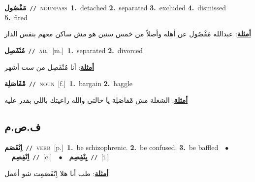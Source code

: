 \documentclass[10pt,a4paper,twoside]{article} %
\begin{document}
\begin{multicols}{2}
{\setlength\topsep{0pt}\textbf{\foreignlanguage{arabic}{مَفْصُول}}\ {\color{gray}\texttt{//}\color{black}}\ \textsc{noun\textunderscore pass}\ \textbf{1.}~detached  \textbf{2.}~separated  \textbf{3.}~excluded  \textbf{4.}~dismissed  \textbf{5.}~fired\  \begin{flushright}\color{gray}\foreignlanguage{arabic}{\textbf{\underline{\foreignlanguage{arabic}{أمثلة}}}: عبدالله مَفْصُول عن أهله وأصلاً من خمس سنين هو مش ساكن معهم بنفس الدار}\end{flushright}\color{black}} \vspace{2mm}

{\setlength\topsep{0pt}\textbf{\foreignlanguage{arabic}{مُنْفَصِل}}\ {\color{gray}\texttt{//}\color{black}}\ \textsc{adj}\ [m.]\ \textbf{1.}~separated  \textbf{2.}~divorced\  \begin{flushright}\color{gray}\foreignlanguage{arabic}{\textbf{\underline{\foreignlanguage{arabic}{أمثلة}}}: أنا مُنْفَصِل من ست أشهر}\end{flushright}\color{black}} \vspace{2mm}

{\setlength\topsep{0pt}\textbf{\foreignlanguage{arabic}{مْفَاصَلِة}}\ {\color{gray}\texttt{//}\color{black}}\ \textsc{noun}\ [f.]\ \textbf{1.}~bargain  \textbf{2.}~haggle\  \begin{flushright}\color{gray}\foreignlanguage{arabic}{\textbf{\underline{\foreignlanguage{arabic}{أمثلة}}}: الشغلة مش مْفاصَلِة يا خالتي والله راعيتك باللي بقدر عليه}\end{flushright}\color{black}} \vspace{2mm}

\vspace{-3mm}
\subsection*{\color{blue}\foreignlanguage{arabic}{ف.ص.م}\color{blue}{}} 

{\setlength\topsep{0pt}\textbf{\foreignlanguage{arabic}{اِنْفَصَم}}\ {\color{gray}\texttt{//}\color{black}}\ \textsc{verb}\ [p.]\ \textbf{1.}~be schizophrenic.  \textbf{2.}~be confused.  \textbf{3.}~be baffled\ \ $\bullet$\ \ \setlength\topsep{0pt}\textbf{\foreignlanguage{arabic}{اِنْفِصِم}}\ {\color{gray}\texttt{//}\color{black}}\ [c.]\ \ $\bullet$\ \ \setlength\topsep{0pt}\textbf{\foreignlanguage{arabic}{يِنْفِصِم}}\ {\color{gray}\texttt{//}\color{black}}\ [i.]\  \begin{flushright}\color{gray}\foreignlanguage{arabic}{\textbf{\underline{\foreignlanguage{arabic}{أمثلة}}}: طب أنا هلا اِنْفَصَمِت شو أعمل}\end{flushright}\color{black}} \vspace{2mm}


\end{multicols}
\end{document}
